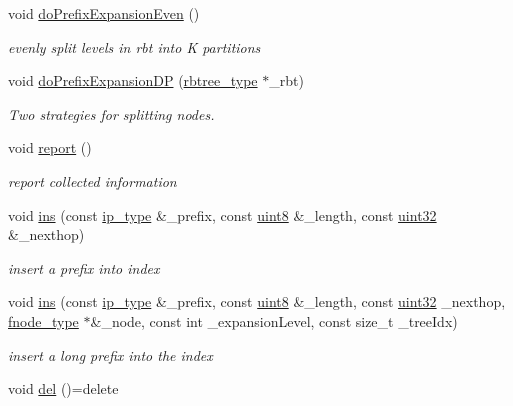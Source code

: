 \begin{DoxyCompactItemize}
void \hyperlink{classRFSTree_aa038a50c8f021a7a681a0eae195b7277}{do\-Prefix\-Expansion\-Even} ()
\begin{DoxyCompactList}\small\item\em evenly split levels in rbt into K partitions \end{DoxyCompactList}\item 
void \hyperlink{classRFSTree_a2cca99cd95253b687f881d664bd7afe1}{do\-Prefix\-Expansion\-D\-P} (\hyperlink{classRFSTree_a883be6d647fcf136a9e6903985387134}{rbtree\-\_\-type} $\ast$\-\_\-rbt)
\begin{DoxyCompactList}\small\item\em Two strategies for splitting nodes. \end{DoxyCompactList}\item 
void \hyperlink{classRFSTree_af560ed34ee3199ebe9da42b5662b5362}{report} ()
\begin{DoxyCompactList}\small\item\em report collected information \end{DoxyCompactList}\item 
void \hyperlink{classRFSTree_a4eff3953319ae3f689ab3f4827eb9a73}{ins} (const \hyperlink{classRFSTree_a7cb02a7e27a8d7ff16271e33dbba26eb}{ip\-\_\-type} \&\-\_\-prefix, const \hyperlink{types_8h_a34ecedcf03a70dc91e4616212d79267d}{uint8} \&\-\_\-length, const \hyperlink{types_8h_abd01e8e67e3d94cab04ecaaf4f85ac1b}{uint32} \&\-\_\-nexthop)
\begin{DoxyCompactList}\small\item\em insert a prefix into index \end{DoxyCompactList}\item 
void \hyperlink{classRFSTree_a6d411a3751a66e887bd39de922da3dca}{ins} (const \hyperlink{classRFSTree_a7cb02a7e27a8d7ff16271e33dbba26eb}{ip\-\_\-type} \&\-\_\-prefix, const \hyperlink{types_8h_a34ecedcf03a70dc91e4616212d79267d}{uint8} \&\-\_\-length, const \hyperlink{types_8h_abd01e8e67e3d94cab04ecaaf4f85ac1b}{uint32} \-\_\-nexthop, \hyperlink{classRFSTree_a82d6848400f7c2700a6283cb34bca3eb}{fnode\-\_\-type} $\ast$\&\-\_\-node, const int \-\_\-expansion\-Level, const size\-\_\-t \-\_\-tree\-Idx)
\begin{DoxyCompactList}\small\item\em insert a long prefix into the index \end{DoxyCompactList}\item 
void \hyperlink{classRFSTree_a7e797086beed715de8b72e3c3c913e73}{del} ()=delete
\item 

\end{DoxyCompactItemize}
